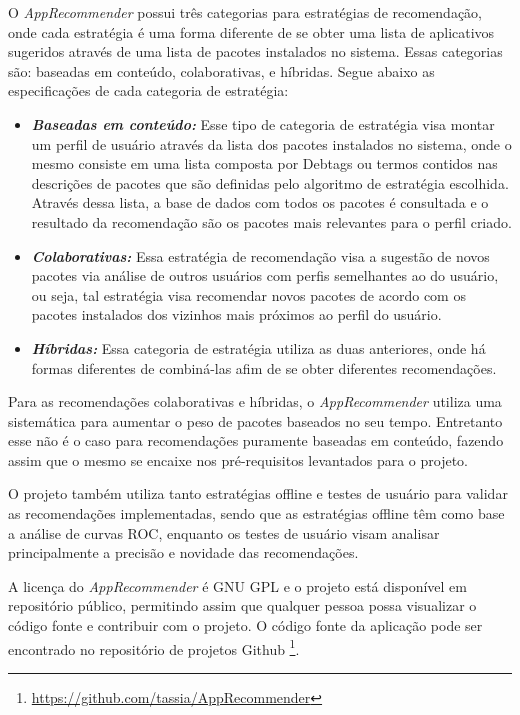 O \textit{AppRecommender} possui três categorias para estratégias de recomendação, onde cada
estratégia é uma forma diferente de se obter uma lista de aplicativos sugeridos
através de uma lista de pacotes instalados no sistema. Essas categorias são: baseadas em conteúdo,
colaborativas, e híbridas. Segue abaixo as especificações de cada categoria de estratégia:

\begin{itemize}
    \item \textit{\textbf{Baseadas em conteúdo:}} Esse tipo de categoria de estratégia
        visa montar um perfil de usuário através da lista dos pacotes instalados no sistema,
        onde o mesmo consiste em uma lista composta por Debtags ou termos contidos nas descrições de pacotes que são
        definidas pelo algoritmo de estratégia escolhida. Através dessa lista, a base de dados
        com todos os pacotes é consultada e o resultado da recomendação são os pacotes mais
        relevantes para o perfil criado.
    \item \textit{\textbf{Colaborativas:}} Essa estratégia de recomendação visa
        a sugestão de novos pacotes via análise de outros usuários com perfis
        semelhantes ao do usuário, ou seja, tal estratégia visa recomendar novos
        pacotes de acordo com os pacotes instalados dos vizinhos mais próximos
        ao perfil do usuário.
    \item \textit{\textbf{Híbridas:}} Essa categoria
        de estratégia utiliza as duas anteriores, onde há formas diferentes de combiná-las
        afim de se obter diferentes recomendações.
\end{itemize}

Para as recomendações colaborativas e híbridas, o \textit{AppRecommender}
utiliza uma sistemática para aumentar o peso de pacotes baseados no seu tempo.
Entretanto esse não é o caso para recomendações puramente baseadas em conteúdo,
fazendo assim que o mesmo se encaixe nos pré-requisitos levantados para o
projeto.

O projeto também utiliza tanto estratégias offline e testes de usuário para
validar as recomendações implementadas, sendo que as estratégias offline têm como
base a análise de curvas ROC, enquanto os testes de usuário visam analisar
principalmente a precisão e novidade das recomendações.

A licença do \textit{AppRecommender} é GNU GPL e o projeto está disponível em repositório
público, permitindo assim que qualquer pessoa possa visualizar o código fonte e
contribuir com o projeto. O código fonte da aplicação pode ser encontrado no
repositório de projetos Github \footnote{\url{https://github.com/tassia/AppRecommender}}.

